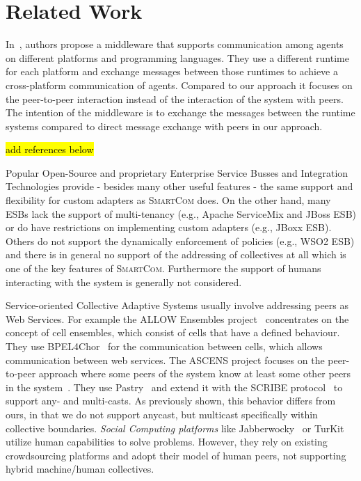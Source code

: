 \documentclass{llncs}
\newcommand{\mdl}{\textsc{SmartCom}}
\begin{document}
\section{Related Work}
\label{sec:relwork}
  
	
  In~\cite{Cabri1}, authors propose a middleware that supports communication among agents on different platforms and programming languages. They use a different runtime for each platform and exchange messages between those runtimes to achieve a cross-platform communication of agents. Compared to our approach it focuses on the peer-to-peer interaction instead of the interaction of the system with peers. The intention of the middleware is to exchange the messages between the runtime systems compared to direct message exchange with peers in our approach.

  \hl{add references below}
  
  Popular Open-Source and proprietary Enterprise Service Busses and Integration Technologies provide - besides many other useful features - the same support and flexibility for custom adapters as \mdl{} does. On the other hand, many ESBs lack the support of multi-tenancy (e.g., Apache ServiceMix and JBoss ESB) or do have restrictions on implementing custom adapters (e.g., JBoxx ESB). Others do not support the dynamically enforcement of policies (e.g., WSO2 ESB) and there is in general no support of the addressing of collectives at all which is one of the key features of \mdl{}. Furthermore the support of humans interacting with the system is generally not considered.

  Service-oriented Collective Adaptive Systems usually involve addressing peers as Web Services. For example the ALLOW Ensembles project~\cite{Andrikopoulos} concentrates on the concept of cell ensembles, which consist of cells that have a defined behaviour. They use BPEL4Chor~\cite{BPEL4Chor} for the communication between cells, which allows communication between web services. 
  The ASCENS project focuses on the peer-to-peer approach where some peers of the system know at least some other peers in the system~\cite{AutonomicCloud}. They use Pastry~\cite{Pastry} and extend it with the SCRIBE protocol~\cite{Scribe} to support any- and multi-casts. As previously shown, this behavior differs from ours, in that we do not support anycast, but multicast specifically within collective boundaries.
  \emph{Social Computing platforms} like Jabberwocky~\cite{Jabberwocky} or TurKit~\cite{Turkit} utilize human capabilities to solve problems. However, they rely on existing crowdsourcing platforms and adopt their model of human peers, not supporting hybrid machine/human collectives.
\end{document}

